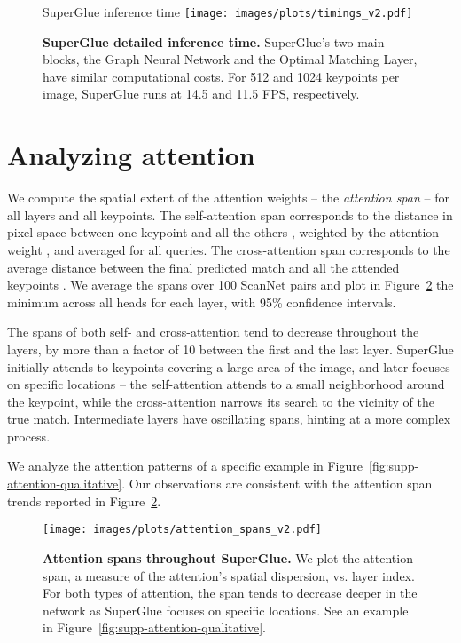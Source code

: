 \documentclass[10pt,twocolumn,letterpaper]{article}
\newcommand{\PAR}[1]{\vskip4pt \noindent{\bf #1~}}
\renewcommand{\*}[1]{\mathbf{#1}}
\newcommand{\0}{\phantom{0}}
\begin{document}
\begin{figure}[t]
\centering
{\footnotesize{}\selectfont SuperGlue inference time}
\texttt{[image: images/plots/timings\_v2.pdf]}\vspace{-1mm}
\caption{\textbf{SuperGlue detailed inference time.} SuperGlue's two main blocks, the Graph Neural Network and the Optimal Matching Layer, have similar computational costs. For 512 and 1024 keypoints per image, SuperGlue runs at 14.5 and 11.5 FPS, respectively.}\label{fig:timings}\vspace{-3mm}
\end{figure}

\section{Analyzing attention}
\label{sec:sup:attention}

\PAR{Quantitative analysis:} We compute the spatial extent of the attention weights -- the \emph{attention span} -- for all layers and all keypoints. The self-attention span corresponds to the distance in pixel space between one keypoint  and all the others , weighted by the attention weight , and averaged for all queries. The cross-attention span corresponds to the average distance between the final predicted match and all the attended keypoints . We average the spans over 100 ScanNet pairs and plot in Figure~\ref{fig:supp-attention-span} the minimum across all heads for each layer, with 95\% confidence intervals.

The spans of both self- and cross-attention tend to decrease throughout the layers, by more than a factor of 10 between the first and the last layer. SuperGlue initially attends to keypoints covering a large area of the image, and later focuses on specific locations -- the self-attention attends to a small neighborhood around the keypoint, while the cross-attention narrows its search to the vicinity of the true match. Intermediate layers have oscillating spans, hinting at a more complex process.

\PAR{Qualitative example:} We analyze the attention patterns of a specific example in Figure~\ref{fig:supp-attention-qualitative}. Our observations are consistent with the attention span trends reported in Figure~\ref{fig:supp-attention-span}.

\begin{figure}[t]
\centering
\texttt{[image: images/plots/attention\_spans\_v2.pdf]}\caption{\textbf{Attention spans throughout SuperGlue.}
We plot the attention span, a measure of the attention's spatial dispersion, vs. layer index. For both types of attention, the span tends to decrease deeper in the network as SuperGlue focuses on specific locations. See an example in Figure~\ref{fig:supp-attention-qualitative}.
}\label{fig:supp-attention-span}\end{figure}
\end{document}
